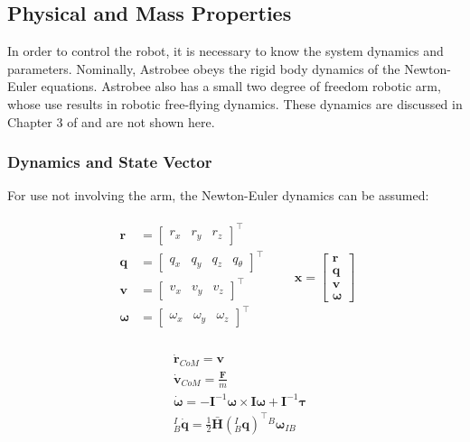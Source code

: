 \documentclass{article}
\begin{document}
\subsection{Physical and Mass Properties}

In order to control the robot, it is necessary to know the system dynamics and parameters. Nominally, Astrobee obeys the rigid body dynamics of the Newton-Euler equations. Astrobee also has a small two degree of freedom robotic arm, whose use results in robotic free-flying dynamics. These dynamics are discussed in Chapter 3 of \cite{Albee2019} and are not shown here.

\subsubsection{Dynamics and State Vector}
For use not involving the arm, the Newton-Euler dynamics can be assumed:

\begin{align*}
\begin{split}
\mathbf{r} &= 
\begin{bmatrix}r_x&r_y&r_z\end{bmatrix}^\top\\
\mathbf{q} &=  
\begin{bmatrix}q_x&q_y&q_z&q_\theta\end{bmatrix}^\top\\
\mathbf{v} &=
\begin{bmatrix}v_x&v_y&v_z\end{bmatrix}^\top\\
\bm{\omega} &=
\begin{bmatrix}\omega_x&\omega_y&\omega_z\end{bmatrix}^\top\\
\end{split}
\quad \quad \mathbf{x} = 
\begin{bmatrix}\mathbf{r}\\\mathbf{q}\\\mathbf{v}\\\bm{\omega}
\end{bmatrix}
\end{align*}

\begin{align*}
&\mathbf{\dot{r}}_{CoM} = \mathbf{v}\\
&\mathbf{\dot{v}}_{CoM} = \frac{\mathbf{F}}{m}\\
&\mathbf{\dot{\bm{\omega}}} = -\mathbf{I}^{-1}\bm{\omega}\times\mathbf{I}\bm{\omega} + \mathbf{I}^{-1}\bm{\tau}\\
&^{I}_{B}\mathbf{\dot{q}} = \frac{1}{2} \bar{\mathbf{H}}(^{I}_{B}\mathbf{q})^{\top} {^{B}\bm{\omega}_{IB}}
\end{align*}
\end{document}
